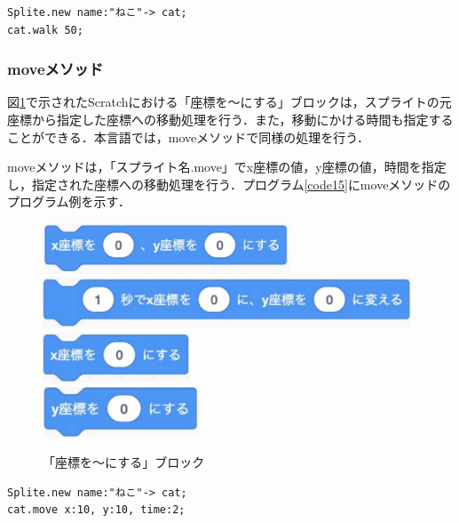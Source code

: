 \documentclass[10pt,a4j]{ltjsarticle}
\begin{document}
\begin{lstlisting}[caption=walkメソッドのプログラム例, label=code14]
Splite.new name:"ねこ"-> cat;
cat.walk 50; 
\end{lstlisting}

\subsubsection{moveメソッド}

図\ref{fig:move}で示されたScratchにおける「座標を〜にする」ブロックは，スプライトの元座標から指定した座標への移動処理を行う．また，移動にかける時間も指定することができる．本言語では，moveメソッドで同様の処理を行う．

moveメソッドは，「スプライト名.move」でx座標の値，y座標の値，時間を指定し，指定された座標への移動処理を行う．プログラム\ref{code15}にmoveメソッドのプログラム例を示す．

\begin{figure}[H]
  \centering
  \includegraphics[height=15mm]{images/move_x_y.pdf} \\
  \includegraphics[height=15mm]{images/move_x_y_time.pdf} \\
  \includegraphics[height=15mm]{images/move_x.pdf} \\
  \includegraphics[height=15mm]{images/move_y.pdf} 
  \caption{「座標を〜にする」ブロック}
  \label{fig:move}
\end{figure}

\begin{lstlisting}[caption=moveメソッドのプログラム例, label=code15]
Splite.new name:"ねこ"-> cat;
cat.move x:10, y:10, time:2; 
\end{lstlisting}
\end{document}
